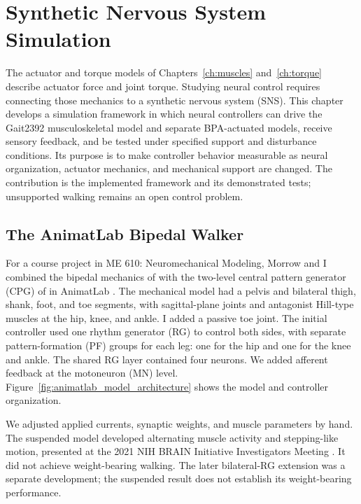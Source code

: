 \chapter{Synthetic Nervous System Simulation}\label{ch:sns}
\graphicspath{{figs/60-sns/}{figs/60-sns/AnimatLab_reference/}}

The actuator and torque models of Chapters~\ref{ch:muscles} and~\ref{ch:torque} describe actuator force and joint torque. Studying neural control requires connecting those mechanics to a synthetic nervous system (SNS). This chapter develops a simulation framework in which neural controllers can drive the Gait2392 musculoskeletal model and separate BPA-actuated models, receive sensory feedback, and be tested under specified support and disturbance conditions. Its purpose is to make controller behavior measurable as neural organization, actuator mechanics, and mechanical support are changed. The contribution is the implemented framework and its demonstrated tests; unsupported walking remains an open control problem.

\section{The AnimatLab Bipedal Walker}\label{sec:prior_walker}

For a course project in ME 610: Neuromechanical Modeling, Morrow and I combined the bipedal mechanics of \citet{li_bipedal_2017} with the two-level central pattern generator (CPG) of \citet{deng_neuromechanical_2019} in AnimatLab \citep{cofer_animatlab_2010}. The mechanical model had a pelvis and bilateral thigh, shank, foot, and toe segments, with sagittal-plane joints and antagonist Hill-type muscles at the hip, knee, and ankle. I added a passive toe joint. The initial controller used one rhythm generator (RG) to control both sides, with separate pattern-formation (PF) groups for each leg: one for the hip and one for the knee and ankle. The shared RG layer contained four neurons. We added afferent feedback at the motoneuron (MN) level. Figure~\ref{fig:animatlab_model_architecture} shows the model and controller organization.

We adjusted applied currents, synaptic weights, and muscle parameters by hand. The suspended model developed alternating muscle activity and stepping-like motion, presented at the 2021 NIH BRAIN Initiative Investigators Meeting \citep{bolenTorqueValuesArtificialKnee2021June15-17}. It did not achieve weight-bearing walking. The later bilateral-RG extension was a separate development; the suspended result does not establish its weight-bearing performance.

